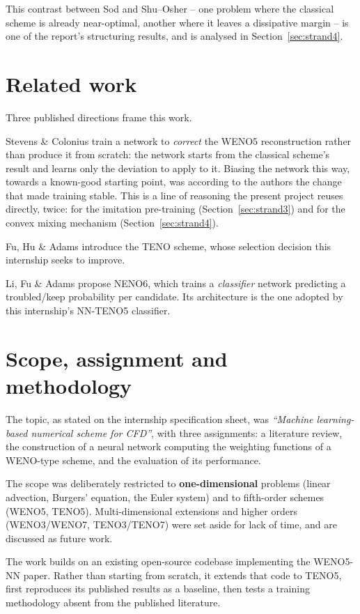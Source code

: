 \documentclass[12pt,a4paper,oneside]{report}
\begin{document}
This contrast between Sod and Shu--Osher -- one problem where the classical
scheme is already near-optimal, another where it leaves a dissipative margin --
is one of the report's structuring results, and is analysed in
Section~\ref{sec:strand4}.

\section{Related work}

Three published directions frame this work.

Stevens \& Colonius \cite{stevens2020} train a network to \emph{correct} the
WENO5 reconstruction rather than produce it from scratch: the network starts
from the classical scheme's result and learns only the deviation to apply to
it. Biasing the network this way, towards a known-good starting point, was
according to the authors the change that made training stable. This is a line
of reasoning the present project reuses directly, twice: for the imitation
pre-training (Section~\ref{sec:strand3}) and for the convex mixing mechanism
(Section~\ref{sec:strand4}).

Fu, Hu \& Adams \cite{fu2016} introduce the TENO scheme, whose selection
decision this internship seeks to improve.

Li, Fu \& Adams \cite{li2022} propose NENO6, which trains a
\emph{classifier} network predicting a troubled/keep probability per candidate.
Its architecture is the one adopted by this internship's NN-TENO5 classifier.

\section{Scope, assignment and methodology}

The topic, as stated on the internship specification sheet, was \emph{``Machine
learning-based numerical scheme for CFD''}, with three assignments: a
literature review, the construction of a neural network computing the weighting
functions of a WENO-type scheme, and the evaluation of its performance.

The scope was deliberately restricted to \textbf{one-dimensional} problems
(linear advection, Burgers' equation, the Euler system) and to fifth-order
schemes (WENO5, TENO5). Multi-dimensional extensions and higher orders
(WENO3/WENO7, TENO3/TENO7) were set aside for lack of time, and are discussed
as future work.

The work builds on an existing open-source codebase implementing the WENO5-NN
paper. Rather than starting from scratch, it extends that code to TENO5, first
reproduces its published results as a baseline, then tests a training
methodology absent from the published literature.
\end{document}
